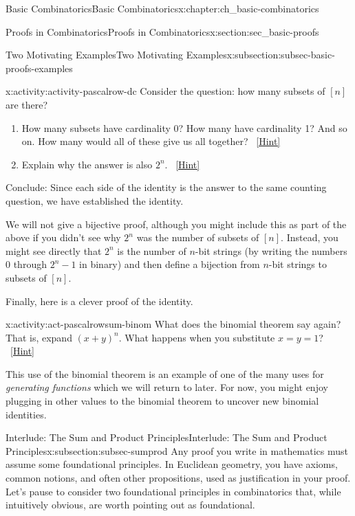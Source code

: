 \documentclass[oneside,10pt,]{book}
\numberwithin{equation}{chapter}
\begin{document}
\begin{chapterptx}{Basic Combinatorics}{}{Basic Combinatorics}{}{}{x:chapter:ch_basic-combinatorics}
\begin{sectionptx}{Proofs in Combinatorics}{}{Proofs in Combinatorics}{}{}{x:section:sec_basic-proofs}
\begin{subsectionptx}{Two Motivating Examples}{}{Two Motivating Examples}{}{}{x:subsection:subsec-basic-proofs-examples}
\begin{activity}{}{x:activity:activity-pascalrow-dc}%
Consider the question: how many subsets of \([n]\) are there?%
\begin{enumerate}[font=\bfseries,label=(\alph*),ref=\alph*]
\item{}How many subsets have cardinality 0?  How many have cardinality 1?  And so on.  How many would all of these give us all together?%
\qquad~\hfill{\tiny\hyperlink{g:hint:idm759-back}{[Hint]}}\item{}Explain why the answer is also \(2^n\).%
\qquad~\hfill{\tiny\hyperlink{g:hint:idm772-back}{[Hint]}}\end{enumerate}
Conclude: Since each side of the identity is the answer to the same counting question, we have established the identity.%
\end{activity}
We will not give a bijective proof, although you might include this as part of the above if you didn't see why \(2^n\) was the number of subsets of \([n]\).  Instead, you might see directly that \(2^n\) is the number of \(n\)-bit strings (by writing the numbers 0 through \(2^n - 1\) in binary) and then define a bijection from \(n\)-bit strings to subsets of \([n]\).%
\par
Finally, here is a clever proof of the identity.%
\begin{activity}{}{x:activity:act-pascalrowsum-binom}%
What does the binomial theorem say again?  That is, expand \((x+y)^n\).  What happens when you substitute \(x = y = 1\)?%
\qquad~\hfill{\tiny\hyperlink{g:hint:idm797-back}{[Hint]}}\end{activity}
This use of the binomial theorem is an example of one of the many uses for \emph{generating functions} which we will return to later.  For now, you might enjoy plugging in other values to the binomial theorem to uncover new binomial identities.%
\end{subsectionptx}
%
%
\typeout{************************************************}
\typeout{************************************************}
%
\begin{subsectionptx}{Interlude: The Sum and Product Principles}{}{Interlude: The Sum and Product Principles}{}{}{x:subsection:subsec-sumprod}
Any proof you write in mathematics must assume some foundational principles.  In Euclidean geometry, you have axioms, common notions, and often other propositions, used as justification in your proof.  Let's pause to consider two foundational principles in combinatorics that, while intuitively obvious, are worth pointing out as foundational.%

\end{subsectionptx}
\end{sectionptx}
\end{chapterptx}
\end{document}
